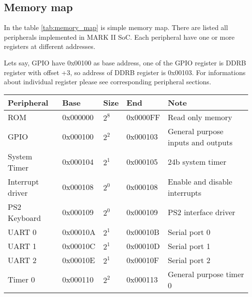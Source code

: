 \subsection{Memory map}

In the table \ref{tab:memory_map} is simple memory map. There are listed all
peripherals implemented in MARK II SoC. Each peripheral have one or more registers at different
addresses.

Lets say, GPIO have 0x00100 as base address, one of the GPIO register
is DDRB register with offset +3, so address of DDRB register is 0x00103. For
informations about individual register please see corresponding peripheral sections.

\begin{table}[h]
    \centering
    \begin{tabular}{|l|l|l|l|l|}
        \hline
        \textbf{Peripheral} & \textbf{Base} & \textbf{Size} & \textbf{End} & \textbf{Note}                                  \\ \hline
        ROM                 & 0x000000      & $2^{8}$       & 0x0000FF     & Read only memory                               \\ \hline
        GPIO                & 0x000100      & $2^{2}$       & 0x000103     & General purpose inputs and outputs             \\ \hline
        System Timer        & 0x000104      & $2^{1}$       & 0x000105     & 24b system timer                               \\ \hline
        Interrupt driver    & 0x000108      & $2^{0}$       & 0x000108     & Enable and disable interrupts                  \\ \hline
        PS2 Keyboard        & 0x000109      & $2^{0}$       & 0x000109     & PS2 interface driver                           \\ \hline
        UART 0              & 0x00010A      & $2^{1}$       & 0x00010B     & Serial port 0                                  \\ \hline
        UART 1              & 0x00010C      & $2^{1}$       & 0x00010D     & Serial port 1                                  \\ \hline
        UART 2              & 0x00010E      & $2^{1}$       & 0x00010F     & Serial port 2                                  \\ \hline
        Timer 0             & 0x000110      & $2^{2}$       & 0x000113     & General purpose timer 0                        \\ \hline

\end{tabular}
\end{table}
